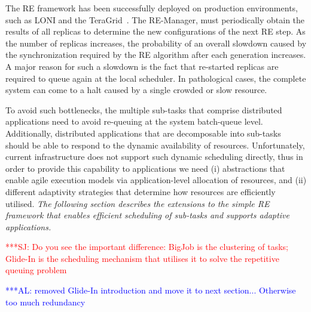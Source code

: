 \documentclass{rspublic}
\newcommand{\alnote}[1]{ {\textcolor{blue} { ***AL: #1 }}}
\newcommand{\jhanote}[1]{ {\textcolor{red} { ***SJ: #1 }}}
\newcommand{\alnote}[1]{}
\newcommand{\jhanote}[1]{}
\begin{document}
The RE framework has been successfully deployed on production
environments, such as LONI and the TeraGrid~\citep{Luckow:2008la}.
The RE-Manager, must periodically obtain the results of all replicas
to determine the new configurations of the next RE step.  As the
number of replicas increases, the probability of an overall slowdown
caused by the synchronization required by the RE algorithm after each
generation increases.  A major reason for such a slowdown is the fact that
re-started replicas are required to queue again at
the local scheduler.  In pathological cases, the complete system can
come to a halt caused by a single crowded or slow resource.

To avoid such bottlenecks, the multiple sub-tasks that comprise
distributed applications need to avoid re-queuing at the system
batch-queue level.  Additionally, distributed applications that are
decomposable into sub-tasks should be able to respond to the dynamic
availability of resources.  Unfortunately, current infrastructure does
not support such dynamic scheduling directly, thus in order to provide
this capability to applications we need (i) abstractions that enable
agile execution models via application-level allocation of resources,
and (ii) different adaptivity strategies that determine how resources
are efficiently utilised.  {\it The following section describes the
  extensions to the simple RE framework that enables efficient
  scheduling of sub-tasks and supports adaptive applications.}




\jhanote{Do you see the important difference: BigJob is the clustering
  of tasks; Glide-In is the scheduling mechanism that utilises it to
  solve the repetitive queuing problem}

\alnote{removed Glide-In introduction and move it to next
  section... Otherwise too much redundancy}


\end{document}

